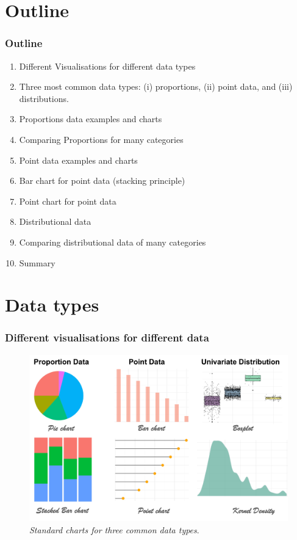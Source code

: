 \documentclass{beamer}
\begin{document}
\section{Outline}
\begin{frame}[t]\frametitle{Outline}
\begin{enumerate}
\item Different Visualisations for different data types
\item Three most common data types: (i) proportions, (ii) point data, and (iii) distributions.
\item Proportions data examples and charts
\item Comparing Proportions for many categories
\item Point data examples and charts 
\item Bar chart for point data (stacking principle)
\item Point chart for point data
\item Distributional data
\item Comparing distributional data of many categories
\item Summary
\end{enumerate}
\end{frame}

\section{Data types}
\begin{frame}[t]\frametitle{Different visualisations for different data}\vspace{5pt}
\begin{figure}
\includegraphics[width=0.99\linewidth]{PlotsLec1/DifferentDataCharts}
\caption{\textit{Standard charts for three common data types}.}
\end{figure}
\end{frame}
\end{document}

